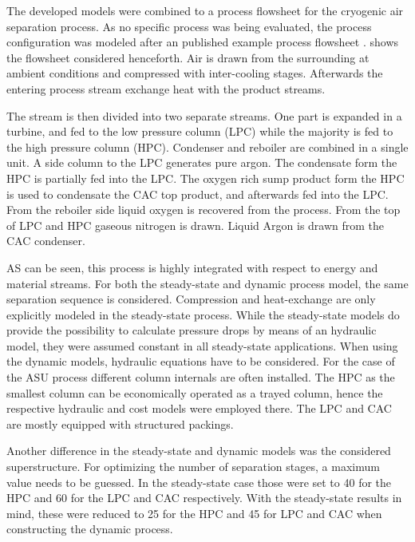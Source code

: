         The developed models were combined to a process flowsheet for the cryogenic air separation process.
        As no specific process was being evaluated, the process configuration was modeled after an
        published example process flowsheet \cite{Kooijman.}. 
        shows the flowsheet considered henceforth. Air is drawn from the surrounding at ambient conditions
        and compressed with inter-cooling stages. Afterwards the entering process stream exchange heat
        with the product streams.

        The stream is then divided into two separate streams. One part is expanded in a turbine, and fed to
        the low pressure column (LPC) while the majority is fed to the high pressure column (HPC).
        Condenser and reboiler are combined in a single unit. A side column to the LPC generates pure
        argon. The condensate form the HPC is partially fed into the LPC. The oxygen rich sump product form the HPC
        is used to condensate the CAC top product, and afterwards fed into the LPC. From the reboiler side liquid oxygen
        is recovered from the process. From the top of LPC and HPC gaseous nitrogen is drawn. Liquid Argon is drawn from
        the CAC condenser.

        AS can be seen, this process is highly integrated with respect to energy and material streams. For both the
        steady-state and dynamic process model, the same separation sequence is considered. Compression and heat-exchange
        are only explicitly modeled in the steady-state process. While the steady-state models do provide the possibility
        to calculate pressure drops by means of an hydraulic model, they were assumed constant in all steady-state applications.
        When using the dynamic models, hydraulic equations have to be considered. For the case of the ASU process different column
        internals are often installed. The HPC as the smallest column can be economically operated as a trayed column, hence the
        respective hydraulic and cost models were employed there. The LPC and CAC are mostly equipped with structured
        packings.

        Another difference in the steady-state and dynamic models was the considered superstructure. For optimizing the number
        of separation stages, a maximum value needs to be guessed. In the steady-state case those were set to 40 for the HPC
        and 60 for the LPC and CAC respectively. With the steady-state results in mind, these were reduced to 25 for the HPC
        and 45 for LPC and CAC when constructing the dynamic process.

